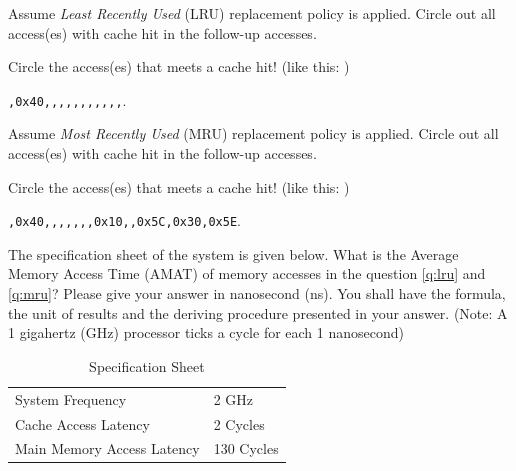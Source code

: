 \begin{questions}
{}

\question[2] Assume \emph{Least Recently Used} (LRU) replacement
policy is applied. Circle out all access(es) with cache hit in
the follow-up accesses. \label{q:lru}

{
    \begin{solution}
        Circle the access(es) that meets a cache hit!
        (like this: \texttt{})\\
        \begin{center}
        \texttt{,0x40,,,,,,,,,,,}.
        \end{center}
    \end{solution}
}

\question[2] Assume \emph{Most Recently Used} (MRU) replacement policy
is applied. Circle out all access(es) with cache hit in the follow-up
accesses. \label{q:mru}

{
    \begin{solution}
        Circle the access(es) that meets a cache hit!
        (like this: \texttt{})\\
        \begin{center}
            \texttt{,0x40,,,,,,,0x10,,0x5C,0x30,0x5E}.
        \end{center}
    \end{solution}
}

\question[6] 
The specification sheet of the system is given below. What is the
Average Memory Access Time (AMAT) of memory accesses in the question
\ref{q:lru} and \ref{q:mru}? Please give your answer in nanosecond 
(ns). You shall have the formula, the unit of results and the
deriving procedure presented in your answer. (Note: A 1 gigahertz
(GHz) processor ticks a cycle for each 1 nanosecond)

\begin{table}[h]
    \centering
    \begin{tabular}{l l}
        \hline %
        System Frequency           & 2 GHz      \\
        Cache Access Latency       & 2 Cycles   \\
        Main Memory Access Latency & 130 Cycles \\
        \hline %
    \end{tabular}
    \caption{Specification Sheet}
    \label{tab:spec_sheet}
\end{table}


\end{questions}
